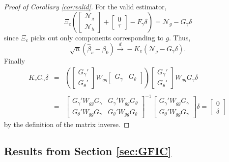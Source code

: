 \begin{proof}[Proof of Corollary \ref{cor:valid}]
For the valid estimator,
	$$\Xi_c \left(\left[\begin{array}{c} \mathscr{N}_g\\  \mathscr{N}_h\end{array}\right]+ \left[ \begin{array}{c} 0\\ \tau\end{array}\right] - F_\gamma\delta\right) =  \mathscr{N}_g - G_\gamma \delta$$
since $\Xi_c$ picks out only components corresponding to $g$. Thus,
	$$\sqrt{n}\left( \widehat{\beta}_v - \beta_0 \right) \overset{d}{\rightarrow} -K_v\left(\mathscr{N}_g - G_\gamma \delta\right).$$
Finally
	\begin{eqnarray*}
		K_v G_\gamma \delta&=&  \left(\left[\begin{array}{c}G_\gamma' \\ G_\theta'\end{array}\right] W_{gg} \left[\begin{array}{cc} G_\gamma & G_\theta \end{array}\right] \right) \left[\begin{array}{c}G_\gamma' \\ G_\theta'\end{array}\right]W_{gg} G_\gamma\delta\\ \\
			&=& \left[\begin{array}{cc} 
				G_\gamma'W_{gg}G_\gamma & G_\gamma'W_{gg}G_\theta\\
				G_\theta'W_{gg}G_\gamma & G_\theta'W_{gg}G_\theta
			\end{array} \right]^{-1}
			\left[\begin{array}{c}
				G_\gamma'W_{gg}G_\gamma\\
				G_\theta'W_{gg}G_\gamma
			\end{array}\right]\delta =\left[\begin{array}{c} 0\\ \delta\end{array}\right]
	\end{eqnarray*}
by the definition of the matrix inverse.
\end{proof}


\subsection*{Results from Section \ref{sec:GFIC}}

